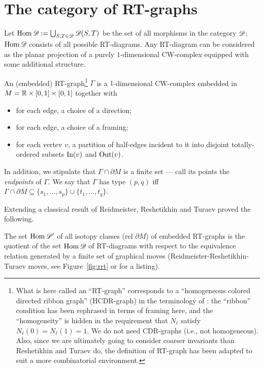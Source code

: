 \section{The category of RT-graphs}
\label{sec:rt-graphs}
Let $\operatorname{Hom}\mathscr{D}_{} := \bigcup_{S,T \in \mathscr{D}_{}} \mathscr{D}_{}(S,T)$ be the set of all
morphisms in the category $\mathscr{D}_{}$; $\operatorname{Hom}\mathscr{D}_{}$ consists of all possible
RT-diagrams. Any RT-diagram can be considered as the planar projection
of a purely $1$-dimensional CW-complex equipped with some additional
structure.
\begin{definition}
  An (embedded) RT-graph\footnote{What is here called an ``RT-graph''
    corresponds to a ``homogeneous colored directed ribbon graph''
    (HCDR-graph) in the terminology of
    \cite{reshetikhin-turaev;ribbon-graphs}: the ``ribbon'' condition
    has been rephrased in terms of framing here, and the
    ``homogeneity'' is hidden in the requirement that $N_\ell$ satisfy
    $N_\ell(0) = N_\ell(1) = 1$. We do not need CDR-graphs (i.e., not
    homogeneous). Also, since we are ultimately going to consider
    coarser invariants than Reshetikhin and Turaev do, the definition
    of RT-graph has been adapted to suit a more combinatorial
    environment.} $\Gamma$ is a $1$-dimensional CW-complex embedded in $M
  = \mathbb{R} \times [0,1] \times [0,1]$ together with
  \begin{itemize}
  \item for each edge, a choice of a direction;
  \item for each edge, a choice of a framing;
  \item for each vertev $v$, a partition of half-edges incident to it
    into disjoint totally-ordered subsets $\operatorname{In}(v)$ and $\operatorname{Out}(v)$.
  \end{itemize}
  In addition, we stipulate that $\Gamma \cap \partial M$ is a finite set --- call
  its points the \emph{endpoints} of $\Gamma$.  We say that $\Gamma$ has type
  $(p,q)$ iff $\Gamma \cap \partial M \subseteq \{ s_1, \ldots, s_p \} \cup \{ t_1, \ldots, t_q \}$.
\end{definition}
Extending a classical result of Reidmeister, Reshetikhin and Turaev
proved the following.
\begin{lemma}\label{lemma:moves}
  The set $\operatorname{Hom}\mathscr{D}'_{}$ of all isotopy classes (rel $\partial M$) of embedded
  RT-graphs is the quotient of the set $\operatorname{Hom}\mathscr{D}_{}$ of RT-diagrams
  with respect to the equivalence relation generated by a finite set
  of graphical moves (Reidmeister-Reshetikhin-Turaev moves, see
  Figure~\ref{fig:rrt} or \cite{reshetikhin-turaev;ribbon-graphs} for a
  listing).
\end{lemma}
